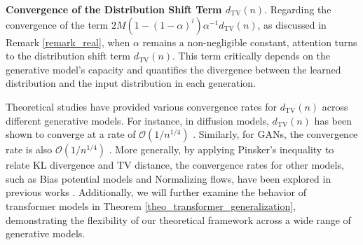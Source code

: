 \begin{remark}\textbf{Convergence of the Distribution Shift Term $d_{\mathrm{TV}}(n)$}.\label{remark_distrubbutionshift}
Regarding the convergence of the term $2 M\left(1-(1-\alpha)^i\right) \alpha^{-1} d_{\mathrm{TV}}(n)$, as discussed in Remark \ref{remark_real}, when $\alpha$ remains a non-negligible constant, attention turns to the distribution shift term $d_{\mathrm{TV}}(n)$. This term critically depends on the generative model's capacity and quantifies the divergence between the learned distribution and the input distribution in each generation. 

Theoretical studies have provided various convergence rates for $d_{\mathrm{TV}}(n)$ across different generative models. For instance, in diffusion models, $d_{\mathrm{TV}}(n)$ has been shown to converge at a rate of $\mathcal{O}\left(1 / n^{1 / 4}\right)$ \citep{futowards}. Similarly, for GANs, the convergence rate is also $\mathcal{O}\left(1 / n^{1 / 4}\right)$ \citep{liang2021well}. More generally, by applying Pinsker's inequality to relate KL divergence and TV distance, the convergence rates for other models, such as Bias potential models and Normalizing flows, have been explored in previous works \citep{yang2022mathematical}. Additionally, we will further examine the behavior of transformer models in Theorem \ref{theo_transformer_generalization}, demonstrating the flexibility of our theoretical framework across a wide range of generative models.


\end{remark}

